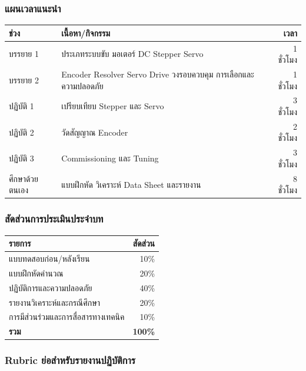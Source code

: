 \subsubsection{แผนเวลาแนะนำ}

\begin{table}[htbp]
    \centering
    \begin{tabular}{l l r}
        \hline
        \textbf{ช่วง} & \textbf{เนื้อหา/กิจกรรม} & \textbf{เวลา} \\
        \hline
        บรรยาย 1 & ประเภทระบบขับ มอเตอร์ DC Stepper Servo & 1 ชั่วโมง \\
        บรรยาย 2 & Encoder Resolver Servo Drive วงรอบควบคุม การเลือกและความปลอดภัย & 1 ชั่วโมง \\
        ปฏิบัติ 1 & เปรียบเทียบ Stepper และ Servo & 3 ชั่วโมง \\
        ปฏิบัติ 2 & วัดสัญญาณ Encoder & 2 ชั่วโมง \\
        ปฏิบัติ 3 & Commissioning และ Tuning & 3 ชั่วโมง \\
        ศึกษาด้วยตนเอง & แบบฝึกหัด วิเคราะห์ Data Sheet และรายงาน & 8 ชั่วโมง \\
        \hline
    \end{tabular}
\end{table}

\subsubsection{สัดส่วนการประเมินประจำบท}

\begin{table}[htbp]
    \centering
    \begin{tabular}{l r}
        \hline
        \textbf{รายการ} & \textbf{สัดส่วน} \\
        \hline
        แบบทดสอบก่อน/หลังเรียน & 10\% \\
        แบบฝึกหัดคำนวณ & 20\% \\
        ปฏิบัติการและความปลอดภัย & 40\% \\
        รายงานวิเคราะห์และกรณีศึกษา & 20\% \\
        การมีส่วนร่วมและการสื่อสารทางเทคนิค & 10\% \\
        \textbf{รวม} & \textbf{100\%} \\
        \hline
    \end{tabular}
\end{table}

\subsubsection{Rubric ย่อสำหรับรายงานปฏิบัติการ}

